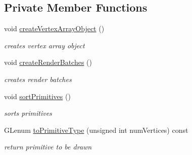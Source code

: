 \subsection*{Private Member Functions}
\begin{DoxyCompactItemize}
\item 
\mbox{\label{classnta_1_1PrimitiveBatch_a1968cc783eb6ce57dec923a7d3ab3a7d}} 
void \hyperlink{classnta_1_1PrimitiveBatch_a1968cc783eb6ce57dec923a7d3ab3a7d}{create\+Vertex\+Array\+Object} ()
\begin{DoxyCompactList}\small\item\em creates vertex array object \end{DoxyCompactList}\item 
void \hyperlink{classnta_1_1PrimitiveBatch_a8b1bcf740a16d65a79566c0a9aebd117}{create\+Render\+Batches} ()
\begin{DoxyCompactList}\small\item\em creates render batches \end{DoxyCompactList}\item 
\mbox{\label{classnta_1_1PrimitiveBatch_ab3bcbcbff64333a994938d6b6862db10}} 
void \hyperlink{classnta_1_1PrimitiveBatch_ab3bcbcbff64333a994938d6b6862db10}{sort\+Primitives} ()
\begin{DoxyCompactList}\small\item\em sorts primitives \end{DoxyCompactList}\item 
\mbox{\label{classnta_1_1PrimitiveBatch_aaa6f5af45276d6562599e82ef430a8ce}} 
G\+Lenum \hyperlink{classnta_1_1PrimitiveBatch_aaa6f5af45276d6562599e82ef430a8ce}{to\+Primitive\+Type} (unsigned int num\+Vertices) const
\begin{DoxyCompactList}\small\item\em return primitive to be drawn \end{DoxyCompactList}\end{DoxyCompactItemize}

